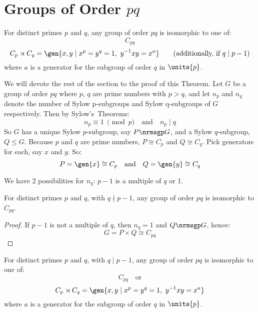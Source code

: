 \section{Groups of Order \(pq\)}
\begin{theorem}\label{thm:pq}
    For distinct primes \(p\) and \(q\), any group of order \(pq\) is isomorphic to one of:
    \[C_{pq}\]
    \[C_{p} \rtimes C_{q} = \gen{x, y \mid x^p = y^q = 1,\ y^{-1}xy = x^a} \tag{additionally, if \(q \mid p-1\)}\]
    where \(a\) is a generator for the subgroup of order \(q\) in \(\units{p}\).
\end{theorem}

We will devote the rest of the section to the proof of this Theorem.
Let \(G\) be a group of order \(pq\) where \(p\), \(q\) are prime numbers with \(p > q\), and let \(n_p\) and \(n_q\)
denote the number of Sylow p-subgroups and Sylow q-subgroups of \(G\) respectively.
Then by Sylow's~Theorems:
\[n_p \equiv 1 \ \pmod{p} \quad \text{and} \quad n_p \mid q\]
So \(G\) has a unique Sylow \(p\)-subgroup, say \(P \nrmsgp G\), and a Sylow \(q\)-subgroup, \(Q \leqslant G\).
Because \(p\) and \(q\) are prime numbers, \(P \cong C_p\) and \(Q \cong C_q\).
Pick generators for each, say \(x\) and \(y\).
So:
\[
    P = \gen{x} \cong C_{p} \quad \text{and} \quad Q = \gen{y} \cong C_q
\]

We have 2 possibilities for \(n_q\): \(p-1\) is a multiple of \(q\) or 1.

\begin{lemma}
    For distinct primes \(p\) and \(q\), with \(q \nmid p-1\), any group of order \(pq\) is isomorphic to \(C_{pq}\).
\end{lemma}

\begin{proof}
    If \(p-1\) is not a multiple of \(q\), then \(n_q = 1\) and \(Q \nrmsgp G\), hence:
    \[G = P \times Q \cong C_{pq}\]
\end{proof}

\begin{lemma}
    For distinct primes \(p\) and \(q\), with \(q \mid p-1\), any group of order \(pq\) is isomorphic to one of:
    \[C_{pq} \quad \text{or}\]
    \[C_{p} \rtimes C_{q} = \gen{x, y \mid x^p = y^q = 1,\ y^{-1}xy = x^a}\]
    where \(a\) is a generator for the subgroup of order \(q\) in \(\units{p}\).
\end{lemma}

